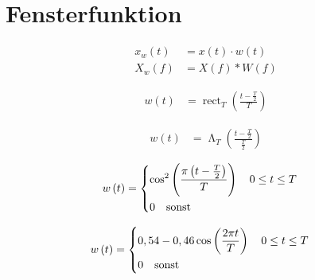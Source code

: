 \section{Fensterfunktion}

\begin{boxleft}
\end{boxleft}\begin{boxrightshaded}
\begin{align*}
x_w\left(t\right)&=x\left(t\right)\cdot w\left(t\right)\\
X_w\left(f\right)&=X\left(f\right)\ast W\left(f\right)
\end{align*}
\end{boxrightshaded}

\begin{boxleft}
\end{boxleft}\begin{boxrightshaded}
\begin{align*}
w\left(t\right)&=\operatorname{rect}_T\left(\frac{t-\frac{T}{2}}{T}\right)
\end{align*}
\end{boxrightshaded}

\begin{boxleft}
\end{boxleft}\begin{boxrightshaded}
\begin{align*}
w\left(t\right)&=\operatorname{\Lambda}_T\left(\frac{t-\frac{T}{2}}{\frac{T}{2}}\right)
\end{align*}
\end{boxrightshaded}

\begin{boxleft}
\end{boxleft}\begin{boxrightshaded}
\begin{align*}
w\left(t\right)&=
\begin{dcases*}
  \cos^2\left(\frac{\pi\left(t-\frac{T}{2}\right)}{T}\right)\quad 0\leq t\leq T\\
  0\quad\text{sonst} 
\end{dcases*}
\end{align*}
\end{boxrightshaded}

\begin{boxleft}
\end{boxleft}\begin{boxrightshaded}
\begin{align*}
w\left(t\right)&=
\begin{dcases*}
  0,54-0,46\cos\left(\frac{2\pi t}{T}\right)\quad 0\leq t\leq T\\
  0\quad\text{sonst} 
\end{dcases*}
\end{align*}
\end{boxrightshaded}

